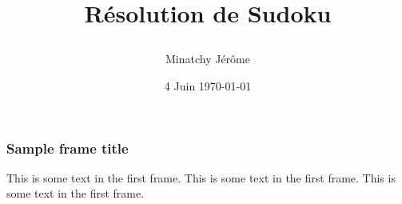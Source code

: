 \documentclass{beamer}
\title{\LARGE{\begin{center}Résolution de Sudoku\end{center}}}
\author{Minatchy Jérôme}
\date{4 Juin \today}
\begin{document}
\frame{\titlepage}

\begin{frame}
\frametitle{Sample frame title}
This is some text in the first frame. This is some text in the first frame. This is some text in the first frame.
\end{frame}
\end{document}
